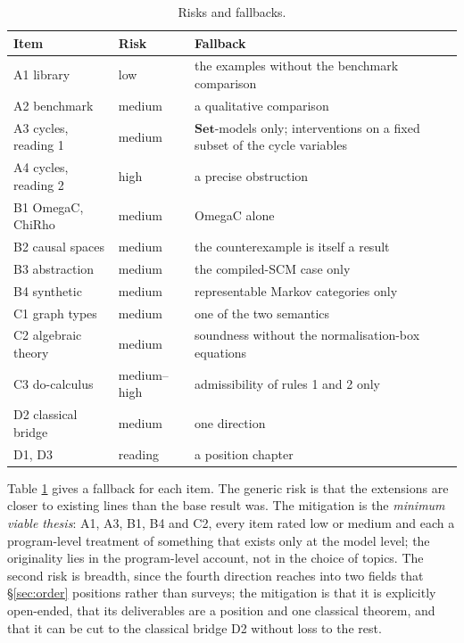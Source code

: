 \begin{table}[ht]
\centering\small
\begin{tabularx}{\textwidth}{llX}
\toprule
Item & Risk & Fallback\\
\midrule
A1 library & low & the examples without the benchmark comparison\\
A2 benchmark & medium & a qualitative comparison\\
A3 cycles, reading 1 & medium & $\mathbf{Set}$-models only; interventions on a fixed subset of the cycle variables\\
A4 cycles, reading 2 & high & a precise obstruction\\
B1 OmegaC, ChiRho & medium & OmegaC alone\\
B2 causal spaces & medium & the counterexample is itself a result\\
B3 abstraction & medium & the compiled-SCM case only\\
B4 synthetic & medium & representable Markov categories only\\
C1 graph types & medium & one of the two semantics\\
C2 algebraic theory & medium & soundness without the normalisation-box equations\\
C3 do-calculus & medium--high & admissibility of rules 1 and 2 only\\
D2 classical bridge & medium & one direction\\
D1, D3 & reading & a position chapter\\
\bottomrule
\end{tabularx}
\caption{Risks and fallbacks.}\label{tab:risks}
\end{table}

Table \ref{tab:risks} gives a fallback for each item. The generic risk is that the extensions are closer to existing lines than the base result was. The mitigation is the \emph{minimum viable thesis}: A1, A3, B1, B4 and C2, every item rated low or medium and each a program-level treatment of something that exists only at the model level; the originality lies in the program-level account, not in the choice of topics. The second risk is breadth, since the fourth direction reaches into two fields that \S\ref{sec:order} positions rather than surveys; the mitigation is that it is explicitly open-ended, that its deliverables are a position and one classical theorem, and that it can be cut to the classical bridge D2 without loss to the rest.

